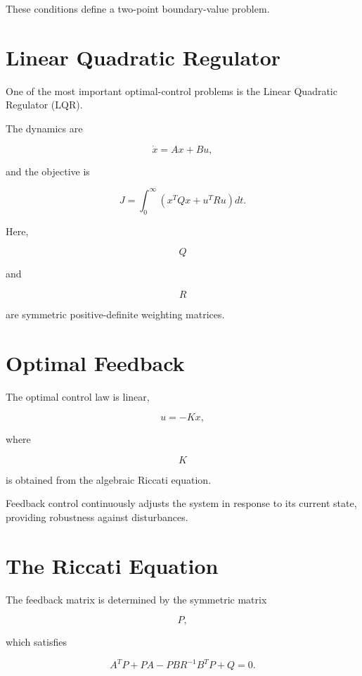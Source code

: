 \documentclass[11pt,fleqn]{book}
\numberwithin{equation}{chapter}
\theoremstyle{plain}
\theoremstyle{definition}
\theoremstyle{remark}
\begin{document}
These conditions define a two-point boundary-value problem.


\section{Linear Quadratic Regulator}

One of the most important optimal-control problems is the Linear
Quadratic Regulator (LQR).

The dynamics are

\[
\dot{x}
=
Ax
+
Bu,
\]

and the objective is

\[
\boxed{
J
=
\int_0^\infty
\left(
x^TQx
+
u^TRu
\right)
dt.
}
\]

Here,

\[
Q
\]

and

\[
R
\]

are symmetric positive-definite weighting matrices.


\section{Optimal Feedback}

The optimal control law is linear,

\[
\boxed{
u
=
-
Kx,
}
\]

where

\[
K
\]

is obtained from the algebraic Riccati equation.

Feedback control continuously adjusts the system in response to its
current state, providing robustness against disturbances.


\section{The Riccati Equation}

The feedback matrix is determined by the symmetric matrix

\[
P,
\]

which satisfies

\[
\boxed{
A^{T}P
+
PA
-
PBR^{-1}B^{T}P
+
Q
=
0.
}
\]
\end{document}
